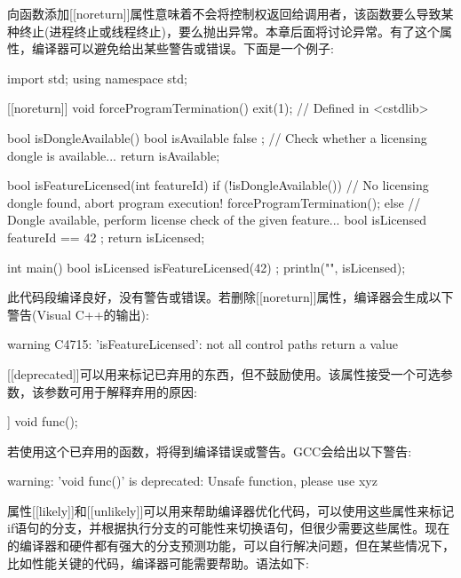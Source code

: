 向函数添加[[noreturn]]属性意味着不会将控制权返回给调用者，该函数要么导致某种终止(进程终止或线程终止)，要么抛出异常。本章后面将讨论异常。有了这个属性，编译器可以避免给出某些警告或错误。下面是一个例子:

\begin{cpp}
import std;
using namespace std;

[[noreturn]] void forceProgramTermination()
{
    exit(1); // Defined in <cstdlib>
}

bool isDongleAvailable()
{
    bool isAvailable { false };
    // Check whether a licensing dongle is available...
    return isAvailable;
}

bool isFeatureLicensed(int featureId)
{
    if (!isDongleAvailable()) {
        // No licensing dongle found, abort program execution!
        forceProgramTermination();
    } else {
        // Dongle available, perform license check of the given feature...
        bool isLicensed { featureId == 42 };
        return isLicensed;
    }
}

int main()
{
    bool isLicensed { isFeatureLicensed(42) };
    println("{}", isLicensed);
}
\end{cpp}

此代码段编译良好，没有警告或错误。若删除[[noreturn]]属性，编译器会生成以下警告(Visual C++的输出):

\begin{shell}
warning C4715: 'isFeatureLicensed': not all control paths return a value
\end{shell}

\mySamllsection{[[deprecated]]}

[[deprecated]]可以用来标记已弃用的东西，但不鼓励使用。该属性接受一个可选参数，该参数可用于解释弃用的原因:

\begin{cpp}
[[deprecated("Unsafe function, please use xyz")]] void func();
\end{cpp}

若使用这个已弃用的函数，将得到编译错误或警告。GCC会给出以下警告:

\begin{shell}
warning: 'void func()' is deprecated: Unsafe function, please use xyz
\end{shell}


属性[[likely]]和[[unlikely]]可以用来帮助编译器优化代码，可以使用这些属性来标记if语句的分支，并根据执行分支的可能性来切换语句，但很少需要这些属性。现在的编译器和硬件都有强大的分支预测功能，可以自行解决问题，但在某些情况下，比如性能关键的代码，编译器可能需要帮助。语法如下:

